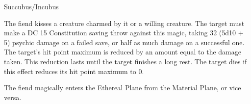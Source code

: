 \begin{monsterbox}{Succubus/Incubus}
\begin{monsteraction}
The fiend kisses a creature charmed by it or a willing creature. The target must make a DC 15 Constitution saving throw against this magic, taking 32 (5d10 + 5) psychic damage on a failed save, or half as much damage on a successful one. The target's hit point maximum is reduced by an amount equal to the damage taken. This reduction lasts until the target finishes a long rest. The target dies if this effect reduces its hit point maximum to 0.
\end{monsteraction}
\begin{monsteraction}[Etherealness]
The fiend magically enters the Ethereal Plane from the Material Plane, or vice versa.
\end{monsteraction}
\end{monsterbox}